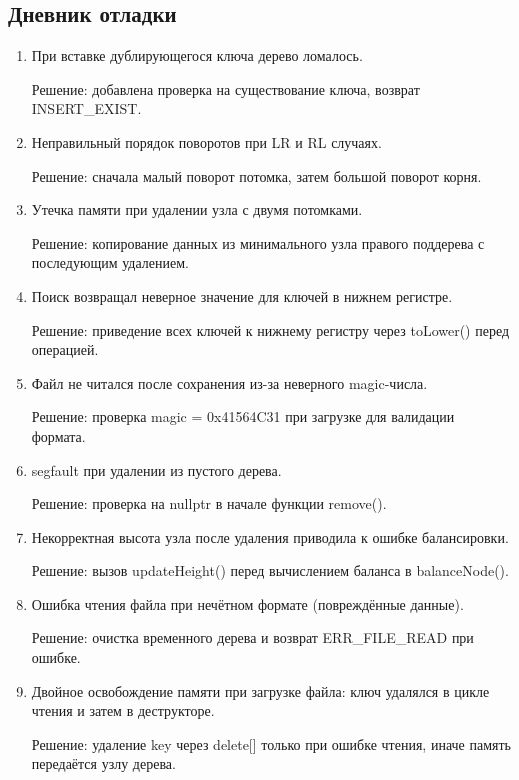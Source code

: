 \documentclass[12pt]{article}
\begin{document}
\subsection*{Дневник отладки}

\begin{enumerate}

\item При вставке дублирующегося ключа дерево ломалось.

Решение: добавлена проверка на существование ключа, возврат INSERT\_EXIST.

\item Неправильный порядок поворотов при LR и RL случаях.

Решение: сначала малый поворот потомка, затем большой поворот корня.

\item Утечка памяти при удалении узла с двумя потомками.

Решение: копирование данных из минимального узла правого поддерева с последующим удалением.

\item Поиск возвращал неверное значение для ключей в нижнем регистре.

Решение: приведение всех ключей к нижнему регистру через toLower() перед операцией.

\item Файл не читался после сохранения из-за неверного magic-числа.

Решение: проверка magic = 0x41564C31 при загрузке для валидации формата.

\item segfault при удалении из пустого дерева.

Решение: проверка на nullptr в начале функции remove().

\item Некорректная высота узла после удаления приводила к ошибке балансировки.

Решение: вызов updateHeight() перед вычислением баланса в balanceNode().

\item Ошибка чтения файла при нечётном формате (повреждённые данные).

Решение: очистка временного дерева и возврат ERR\_FILE\_READ при ошибке.

\item Двойное освобождение памяти при загрузке файла: ключ удалялся в цикле чтения и затем в деструкторе.

Решение: удаление key через delete[] только при ошибке чтения, иначе память передаётся узлу дерева.


\end{enumerate}
\end{document}
